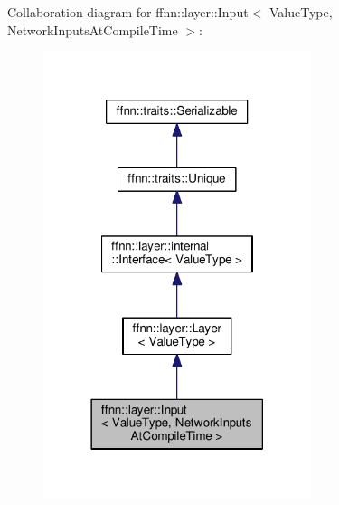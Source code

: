 Collaboration diagram for ffnn\-:\-:layer\-:\-:Input$<$ Value\-Type, Network\-Inputs\-At\-Compile\-Time $>$\-:\nopagebreak
\begin{figure}[H]
\begin{center}
\leavevmode
\includegraphics[width=222pt]{classffnn_1_1layer_1_1_input__coll__graph}
\end{center}
\end{figure}
